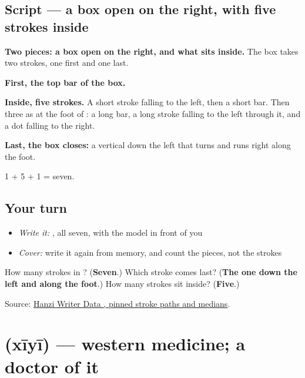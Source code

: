\subsection*{Script — a box open on the right, with five strokes inside}

\begin{quote}
\end{quote}

\textbf{Two pieces: a box open on the right, and what sits inside.} The box takes two strokes, one first and one last.

\textbf{First, the top bar of the box.}

\textbf{Inside, five strokes.} A short stroke falling to the left, then a short bar. Then three as at the foot of : a long bar, a long stroke falling to the left through it, and a dot falling to the right.

\textbf{Last, the box closes:} a vertical down the left that turns and runs right along the foot.

1 + 5 + 1 = seven.

\subsection*{Your turn}
\begin{itemize}
\raggedright
  \item \emph{Write it:} , all seven, with the model in front of you
  \item \emph{Cover:} write it again from memory, and count the pieces, not the strokes
\end{itemize}

\begin{tcolorbox}[breakable,colback=teal!4,colframe=teal!35!black,title={Before you move on}]
How many strokes in ? (\textbf{Seven}.) Which stroke comes last? (\textbf{The one down the left and along the foot}.) How many strokes sit inside? (\textbf{Five}.)

Source: \href{https://raw.githubusercontent.com/chanind/hanzi-writer-data/68d10a4b21150cae5e1ebbd223eed289cf32d90c/data/\%E5\%8C\%BB.json}{Hanzi Writer Data , pinned stroke paths and medians}.
\end{tcolorbox}
\section[\texorpdfstring{\zh{西医} (xīyī)}{西医 (xīyī)}]{ (xīyī) — western medicine; a doctor of it}


